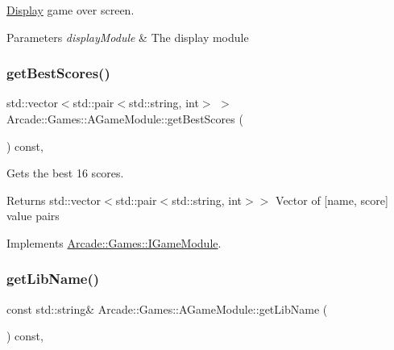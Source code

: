 \mbox{\hyperlink{namespaceArcade_1_1Display}{Display}} game over screen. 


\begin{DoxyParams}{Parameters}
{\em display\+Module} & The display module \\
\hline
\end{DoxyParams}
\mbox{\label{classArcade_1_1Games_1_1AGameModule_aaebba3bd5236f97cb18867fe99c7135b}} 
\subsubsection{\texorpdfstring{getBestScores()}{getBestScores()}}
{\footnotesize\ttfamily std\+::vector$<$std\+::pair$<$std\+::string, int$>$ $>$ Arcade\+::\+Games\+::\+A\+Game\+Module\+::get\+Best\+Scores (\begin{DoxyParamCaption}{ }\end{DoxyParamCaption}) const\hspace{0.3cm}{\ttfamily [final]}, {\ttfamily [virtual]}}



Gets the best 16 scores. 

\begin{DoxyReturn}{Returns}
std\+::vector$<$std\+::pair$<$std\+::string, int$>$$>$ Vector of \mbox{[}name, score\mbox{]} value pairs 
\end{DoxyReturn}


Implements \mbox{\hyperlink{classArcade_1_1Games_1_1IGameModule_afaec4931b0051ba589fbe1b14d20131b}{Arcade\+::\+Games\+::\+I\+Game\+Module}}.

\mbox{\label{classArcade_1_1Games_1_1AGameModule_a3245a3ba2eac74eadf5041bc3806ed6b}} 
\subsubsection{\texorpdfstring{getLibName()}{getLibName()}}
{\footnotesize\ttfamily const std\+::string\& Arcade\+::\+Games\+::\+A\+Game\+Module\+::get\+Lib\+Name (\begin{DoxyParamCaption}{ }\end{DoxyParamCaption}) const\hspace{0.3cm}{\ttfamily [final]}, {\ttfamily [virtual]}}



